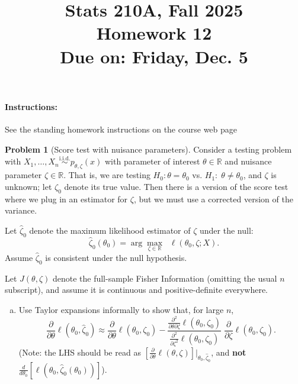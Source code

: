 \documentclass{article}
\newcommand{\RR}{\mathbb{R}}
\newcommand{\simiid}{\overset{\text{i.i.d.}}{\sim}}
\theoremstyle{definition}
\newtheorem{problem}{Problem}
\begin{document}
\title{Stats 210A, Fall 2025\\
  Homework 12 \\
  {\large {\bf Due on}: Friday, Dec. 5}}
\date{}

\maketitle

\paragraph{Instructions:} See the standing homework instructions on the course web page




\begin{problem}[Score test with nuisance parameters]
\label{prob:score-nuisance}
Consider a testing problem with $X_1,\ldots,X_n \simiid p_{\theta,\zeta}(x)$ with parameter of interest $\theta \in \RR$ and nuisance parameter $\zeta\in \RR$. That is, we are testing $H_0:\theta = \theta_0$ vs. $H_1:\; \theta \neq \theta_0$, and $\zeta$ is unknown; let $\zeta_0$ denote its true value. Then there is a version of the score test where we plug in an estimator for $\zeta$, but we must use a corrected version of the variance.

Let $\hat\zeta_0$ denote the maximum likelihood estimator of $\zeta$ under the null:
\[
\hat\zeta_0(\theta_0) = \arg\max_{\zeta\in\RR} \;\;\ell(\theta_0,\zeta; X).
\]
Assume $\hat\zeta_0$ is consistent under the null hypothesis.

Let $J(\theta,\zeta)$ denote the full-sample Fisher Information (omitting the usual $n$ subscript), and assume it is continuous and positive-definite everywhere.

\begin{enumerate}[(a)]
\item Use Taylor expansions informally to show that, for large $n$,
\[
\frac{\partial}{\partial\theta} \ell(\theta_0,\hat\zeta_0)
\approx \frac{\partial}{\partial\theta}\ell(\theta_0,\zeta_0)
- \frac{\frac{\partial^2}{\partial\theta\partial\zeta} \ell(\theta_0,\zeta_0)}
{\frac{\partial^2}{\partial\zeta^2} \ell(\theta_0,\zeta_0)} \;\frac{\partial}{\partial\zeta} \ell(\theta_0,\zeta_0).
\]
(Note: the LHS should be read as $[\frac{\partial}{\partial\theta} \ell(\theta,\zeta)]\big|_{\theta_0,\hat\zeta_0}$, and {\bf not} $\frac{d}{d\theta_0} [\ell(\theta_0,\hat\zeta_0(\theta_0))]$).





\end{enumerate}
\end{problem}
\end{document}
